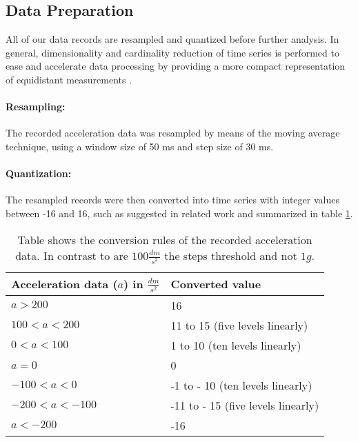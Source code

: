 \subsection{Data Preparation} \label{data_preparation}

All of our data records are resampled and quantized before further analysis. In general, dimensionality and cardinality reduction of time series is performed to ease and accelerate data processing by providing a more compact representation of equidistant measurements \cite{liu2009uwave}.

\paragraph{Resampling:} The recorded acceleration data was resampled by means of the moving average technique, using a window size of 50 ms and step size of 30 ms.

\paragraph{Quantization:} The resampled records were then converted into time series with integer values between -16 and 16, such as suggested in related work \cite{liu2009uwave} and summarized in table \ref{table:conversion}.

\begin{table}
    \begin{center}
        \begin{tabularx}{\textwidth}{XX}
            \hline
            \textbf{Acceleration data ($a$) in $\frac{dm}{s^2}$} & \textbf{Converted value}\\
            \hline
            $a > 200$ & 16\\
            $100 < a < 200$ & 11 to 15 (five levels linearly)\\
            $0 < a < 100$ & 1 to 10 (ten levels linearly)\\
            $a = 0$ & 0\\
            $-100 < a < 0$ & -1 to - 10 (ten levels linearly)\\
            $-200 < a < -100$ & -11 to - 15 (five levels linearly)\\
            $a < -200$ & -16\\
            \hline
        \end{tabularx}
    \end{center}
    \caption{Table shows the conversion rules of the recorded acceleration data. In contrast to \cite{liu2009uwave} are
    $100\frac{dm}{s^2}$ the steps threshold and not $1g$.}
	\label{table:conversion}
\end{table}

